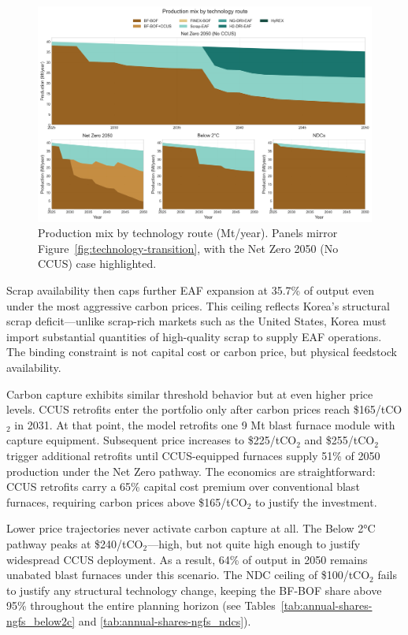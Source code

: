 \documentclass[preprint,1p,authoryear]{elsarticle}
\begin{document}
\begin{figure}[!t]
  \centering
  \includegraphics[width=0.8\linewidth]{production_mix_evolution}
  \caption{Production mix by technology route (Mt/year). Panels mirror Figure~\ref{fig:technology-transition}, with the Net Zero 2050 (No CCUS) case highlighted.}
  \label{fig:production-mix}
\end{figure}

Scrap availability then caps further EAF expansion at 35.7\% of output even under the most aggressive carbon prices. This ceiling reflects Korea's structural scrap deficit—unlike scrap-rich markets such as the United States, Korea must import substantial quantities of high-quality scrap to supply EAF operations. The binding constraint is not capital cost or carbon price, but physical feedstock availability.

Carbon capture exhibits similar threshold behavior but at even higher price levels. CCUS retrofits enter the portfolio only after carbon prices reach \$165/tCO$_2$ in 2031. At that point, the model retrofits one 9 Mt blast furnace module with capture equipment. Subsequent price increases to \$225/tCO$_2$ and \$255/tCO$_2$ trigger additional retrofits until CCUS-equipped furnaces supply 51\% of 2050 production under the Net Zero pathway. The economics are straightforward: CCUS retrofits carry a 65\% capital cost premium over conventional blast furnaces, requiring carbon prices above \$165/tCO$_2$ to justify the investment.

Lower price trajectories never activate carbon capture at all. The Below 2°C pathway peaks at \$240/tCO$_2$—high, but not quite high enough to justify widespread CCUS deployment. As a result, 64\% of output in 2050 remains unabated blast furnaces under this scenario. The NDC ceiling of \$100/tCO$_2$ fails to justify any structural technology change, keeping the BF-BOF share above 95\% throughout the entire planning horizon (see Tables~\ref{tab:annual-shares-ngfs_below2c} and \ref{tab:annual-shares-ngfs_ndcs}).
\end{document}
